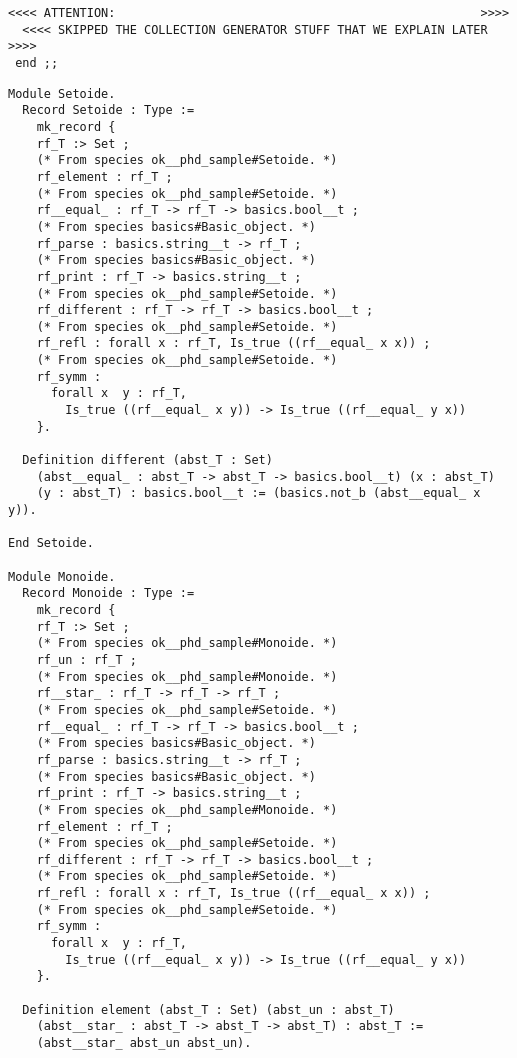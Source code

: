 {\begin{lstlisting}[language=MyOCaml]
  <<<< ATTENTION:                                                   >>>>
  <<<< SKIPPED THE COLLECTION GENERATOR STUFF THAT WE EXPLAIN LATER >>>>
 end ;;
\end{lstlisting}}


{\footnotesize
\begin{lstlisting}[language=MyCoq]
Module Setoide.
  Record Setoide : Type :=
    mk_record {
    rf_T :> Set ;
    (* From species ok__phd_sample#Setoide. *)
    rf_element : rf_T ;
    (* From species ok__phd_sample#Setoide. *)
    rf__equal_ : rf_T -> rf_T -> basics.bool__t ;
    (* From species basics#Basic_object. *)
    rf_parse : basics.string__t -> rf_T ;
    (* From species basics#Basic_object. *)
    rf_print : rf_T -> basics.string__t ;
    (* From species ok__phd_sample#Setoide. *)
    rf_different : rf_T -> rf_T -> basics.bool__t ;
    (* From species ok__phd_sample#Setoide. *)
    rf_refl : forall x : rf_T, Is_true ((rf__equal_ x x)) ;
    (* From species ok__phd_sample#Setoide. *)
    rf_symm :
      forall x  y : rf_T,
        Is_true ((rf__equal_ x y)) -> Is_true ((rf__equal_ y x))
    }.
  
  Definition different (abst_T : Set)
    (abst__equal_ : abst_T -> abst_T -> basics.bool__t) (x : abst_T)
    (y : abst_T) : basics.bool__t := (basics.not_b (abst__equal_ x y)).
  
End Setoide.

Module Monoide.
  Record Monoide : Type :=
    mk_record {
    rf_T :> Set ;
    (* From species ok__phd_sample#Monoide. *)
    rf_un : rf_T ;
    (* From species ok__phd_sample#Monoide. *)
    rf__star_ : rf_T -> rf_T -> rf_T ;
    (* From species ok__phd_sample#Setoide. *)
    rf__equal_ : rf_T -> rf_T -> basics.bool__t ;
    (* From species basics#Basic_object. *)
    rf_parse : basics.string__t -> rf_T ;
    (* From species basics#Basic_object. *)
    rf_print : rf_T -> basics.string__t ;
    (* From species ok__phd_sample#Monoide. *)
    rf_element : rf_T ;
    (* From species ok__phd_sample#Setoide. *)
    rf_different : rf_T -> rf_T -> basics.bool__t ;
    (* From species ok__phd_sample#Setoide. *)
    rf_refl : forall x : rf_T, Is_true ((rf__equal_ x x)) ;
    (* From species ok__phd_sample#Setoide. *)
    rf_symm :
      forall x  y : rf_T,
        Is_true ((rf__equal_ x y)) -> Is_true ((rf__equal_ y x))
    }.
  
  Definition element (abst_T : Set) (abst_un : abst_T)
    (abst__star_ : abst_T -> abst_T -> abst_T) : abst_T :=
    (abst__star_ abst_un abst_un).
  

\end{lstlisting}}
